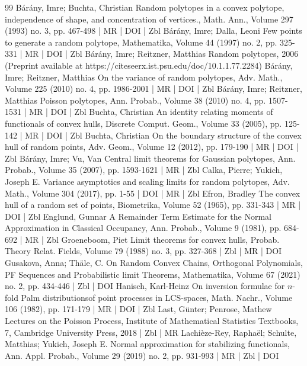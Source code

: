 \begin{thebibliography}{99}
 Bárány, Imre; Buchta, Christian Random polytopes in a convex polytope, independence of shape, and concentration of vertices., Math. Ann., Volume 297 (1993) no. 3, pp. 467-498 | MR | DOI | Zbl
 Bárány, Imre; Dalla, Leoni Few points to generate a random polytope, Mathematika, Volume 44 (1997) no. 2, pp. 325-331 | MR | DOI | Zbl
 Bárány, Imre; Reitzner, Matthias Random polytopes, 2006 (Preprint available at https://citeseerx.ist.psu.edu/doc/10.1.1.77.2284)
 Bárány, Imre; Reitzner, Matthias On the variance of random polytopes, Adv. Math., Volume 225 (2010) no. 4, pp. 1986-2001 | MR | DOI | Zbl
 Bárány, Imre; Reitzner, Matthias Poisson polytopes, Ann. Probab., Volume 38 (2010) no. 4, pp. 1507-1531 | MR | DOI | Zbl
 Buchta, Christian An identity relating moments of functionals of convex hulls, Discrete Comput. Geom., Volume 33 (2005), pp. 125-142 | MR | DOI | Zbl
 Buchta, Christian On the boundary structure of the convex hull of random points, Adv. Geom., Volume 12 (2012), pp. 179-190 | MR | DOI | Zbl
 Bárány, Imre; Vu, Van Central limit theorems for Gaussian polytopes, Ann. Probab., Volume 35 (2007), pp. 1593-1621 | MR | Zbl
 Calka, Pierre; Yukich, Joseph E. Variance asymptotics and scaling limits for random polytopes, Adv. Math., Volume 304 (2017), pp. 1-55 | DOI | MR | Zbl
 Efron, Bradley The convex hull of a random set of points, Biometrika, Volume 52 (1965), pp. 331-343 | MR | DOI | Zbl
 Englund, Gunnar A Remainder Term Estimate for the Normal Approximation in Classical Occupancy, Ann. Probab., Volume 9 (1981), pp. 684-692 | MR | Zbl
 Groeneboom, Piet Limit theorems for convex hulls, Probab. Theory Relat. Fields, Volume 79 (1988) no. 3, pp. 327-368 | Zbl | MR | DOI
 Gusakova, Anna; Thäle, C. On Random Convex Chains, Orthogonal Polynomials, PF Sequences and Probabilistic limit Theorems, Mathematika, Volume 67 (2021) no. 2, pp. 434-446 | Zbl | DOI
 Hanisch, Karl-Heinz On inversion formulae for $n$-fold Palm distributionsof point processes in LCS-spaces, Math. Nachr., Volume 106 (1982), pp. 171-179 | MR | DOI | Zbl
 Last, Günter; Penrose, Mathew Lectures on the Poisson Process, Institute of Mathematical Statistics Textbooks, 7, Cambridge University Press, 2018 | Zbl | MR
 Lachièze-Rey, Raphaël; Schulte, Matthias; Yukich, Joseph E. Normal approximation for stabilizing functionals, Ann. Appl. Probab., Volume 29 (2019) no. 2, pp. 931-993 | MR | Zbl | DOI

\end{thebibliography}
